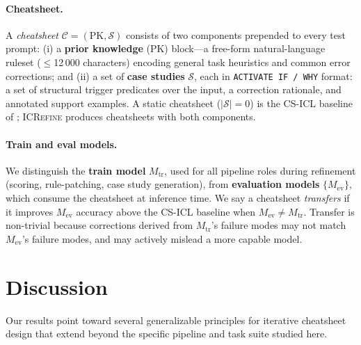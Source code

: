 \paragraph{Cheatsheet.}
A \emph{cheatsheet} $\mathcal{C} = (\text{PK}, \mathcal{S})$ consists of two components
prepended to every test prompt:
(i) a \textbf{prior knowledge} (PK) block---a free-form natural-language ruleset
($\leq$12\,000 characters) encoding general task heuristics and common error corrections;
and (ii) a set of \textbf{case studies} $\mathcal{S}$, each in \texttt{ACTIVATE~IF\,/\,WHY}
format: a set of structural trigger predicates over the input, a correction rationale, and
annotated support examples.
A static cheatsheet ($|\mathcal{S}| = 0$) is the CS-ICL baseline of \citet{csicl2024};
\textsc{ICRefine} produces cheatsheets with both components.

\paragraph{Train and eval models.}
We distinguish the \textbf{train model} $M_\text{tr}$, used for all pipeline roles during
refinement (scoring, rule-patching, case study generation), from \textbf{evaluation models}
$\{M_\text{ev}\}$, which consume the cheatsheet at inference time.
We say a cheatsheet \emph{transfers} if it improves $M_\text{ev}$ accuracy above the CS-ICL
baseline when $M_\text{ev} \neq M_\text{tr}$.
Transfer is non-trivial because corrections derived from $M_\text{tr}$'s failure modes may
not match $M_\text{ev}$'s failure modes, and may actively mislead a more capable model.


\section{Discussion}
\label{sec:discussion}

Our results point toward several generalizable principles for iterative cheatsheet design
that extend beyond the specific pipeline and task suite studied here.

